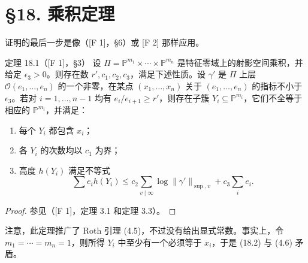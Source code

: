 \section*{§18. 乘积定理}
证明的最后一步是像（[F 1]，§6）或 [F 2] 那样应用。
\begin{statement}{定理 18.1（[F 1]，§3）}
设 $\Pi=\mathbb P^{m_1}\times\cdots\times\mathbb P^{m_n}$ 是特征零域上的射影空间乘积，并给定 $\epsilon_3>0$。则存在数 $r',c_1,c_2,c_3$，满足下述性质。设 $\gamma'$ 是 $\Pi$ 上层 $\mathcal O(e_1,\ldots,e_n)$ 的一个非零，在某点 $(x_1,\ldots,x_n)$ 关于 $(e_1,\ldots,e_n)$ 的指标不小于 $\epsilon_3$。若对 $i=1,\ldots,n-1$ 均有 $e_i/e_{i+1}\ge r'$，则存在子簇 $Y_i\subseteq\mathbb P^{m_i}$，它们不全等于相应的 $\mathbb P^{m_i}$，并满足：
\begin{enumerate}[label=(\roman*).]
\item 每个 $Y_i$ 都包含 $x_i$；
\item 各 $Y_i$ 的次数均以 $c_1$ 为界；
\item 高度 $h(Y_i)$ 满足不等式
\begin{equation*}\tag{18.2}
\sum e_i h(Y_i)\le c_2\sum_{v\mid\infty}\log\|\gamma'\|_{\sup,v}+c_3\sum_i e_i.
\end{equation*}
\end{enumerate}
\end{statement}
\begin{proof}
参见（[F 1]，定理 3.1 和定理 3.3）。
\end{proof}
注意，此定理推广了 Roth 引理 (4.5)，不过没有给出显式常数。事实上，令 $m_1=\cdots=m_n=1$，则所得 $Y_i$ 中至少有一个必须等于 $x_i$，于是 (18.2) 与 (4.6) 矛盾。

